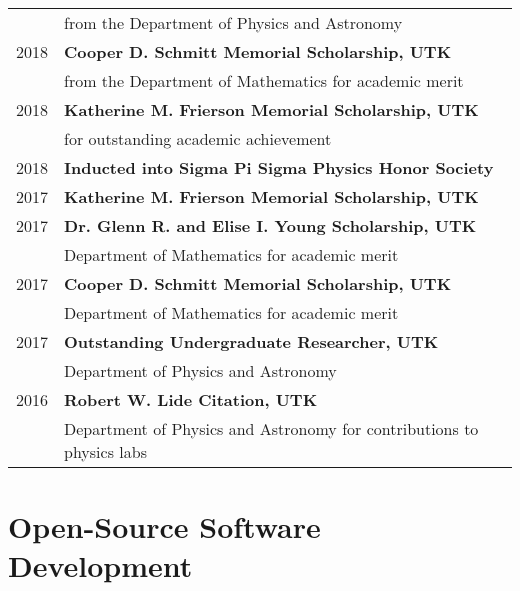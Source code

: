 \documentclass[letterpaper]{deedy-resume} %
\begin{document}
\begin{minipage}[t]{0.63\textwidth}
\begin{tabular}{rl}
          &  from the Department of Physics and Astronomy \\
  2018 & \textbf{Cooper D. Schmitt Memorial Scholarship, UTK}\\
          & from the Department of Mathematics for academic merit \\
  2018 & \textbf{Katherine M. Frierson Memorial Scholarship, UTK}\\
          & for outstanding academic achievement \\
  2018 & \textbf{Inducted into Sigma Pi Sigma Physics Honor Society} \\
  2017 & \textbf{Katherine M. Frierson Memorial Scholarship, UTK} \\
  2017 & \textbf{Dr. Glenn R. and Elise I. Young Scholarship, UTK}\\
          & Department of Mathematics for academic merit \\
  2017 & \textbf{Cooper D. Schmitt Memorial Scholarship, UTK}\\
          & Department of Mathematics for academic merit \\
  2017 & \textbf{Outstanding Undergraduate Researcher, UTK}\\
          & Department of Physics and Astronomy \\
  2016 & \textbf{Robert W. Lide Citation, UTK}\\
          & Department of Physics and Astronomy for contributions to physics labs  \\
\end{tabular}

\sectionspace %



\end{minipage} %
\clearpage


\section{Open-Source Software Development}
\end{document}
